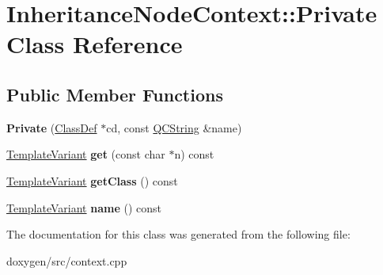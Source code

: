 \hypertarget{class_inheritance_node_context_1_1_private}{}\section{Inheritance\+Node\+Context\+::Private Class Reference}
\label{class_inheritance_node_context_1_1_private}
\subsection*{Public Member Functions}
\begin{DoxyCompactItemize}
\item 
\mbox{\label{class_inheritance_node_context_1_1_private_ab68815229a9c130269aa0374a4a35143}} 
{\bfseries Private} (\mbox{\hyperlink{class_class_def}{Class\+Def}} $\ast$cd, const \mbox{\hyperlink{class_q_c_string}{Q\+C\+String}} \&name)
\item 
\mbox{\label{class_inheritance_node_context_1_1_private_ad29aa97a73adcefb8b6b90d6caaddef0}} 
\mbox{\hyperlink{class_template_variant}{Template\+Variant}} {\bfseries get} (const char $\ast$n) const
\item 
\mbox{\label{class_inheritance_node_context_1_1_private_ad4d2342c58e624cc4a0f9d6d97e97479}} 
\mbox{\hyperlink{class_template_variant}{Template\+Variant}} {\bfseries get\+Class} () const
\item 
\mbox{\label{class_inheritance_node_context_1_1_private_aab8c947d165cf9d821ff7a123b95858e}} 
\mbox{\hyperlink{class_template_variant}{Template\+Variant}} {\bfseries name} () const
\end{DoxyCompactItemize}


The documentation for this class was generated from the following file\+:\begin{DoxyCompactItemize}
\item 
doxygen/src/context.\+cpp\end{DoxyCompactItemize}
